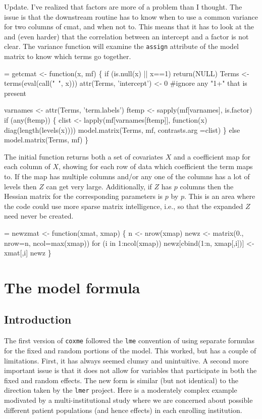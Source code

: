 \documentclass{article}
\begin{document}
Update. I've realized that factors are more of a problem than I   %
thought.  The issue is that the downstream routine has to know
when to use a common variance for two columns of cmat, and when not to.
This means that it has to look at the 
and (even harder) that the correlation between an intercept and a factor
is not clear.  The variance function will examine the \Verb!assign! attribute
of the model matrix to know which terms go together.
\begin{nwchunk}
=
 getcmat <- function(x, mf) \{
     if (is.null(x) || x==1) return(NULL)
     Terms <- terms(eval(call("~", x)))
     attr(Terms, 'intercept') <- 0  #ignore any "1+" that is present
 
     varnames <-  attr(Terms, 'term.labels')
     ftemp <- sapply(mf[varnames], is.factor)
     if (any(ftemp)) \{
         clist <- lapply(mf[varnames[ftemp]], 
                         function(x) diag(length(levels(x))))
         model.matrix(Terms, mf, contrasts.arg =clist)
         \}
     else model.matrix(Terms, mf)
     \}
\end{nwchunk}

The initial function returns both a set of covariates $X$ and
a coefficient map for each column of $X$, showing for each
row of data which coefficient the term maps to.
If the map has multiple columns and/or any one of the columns has a lot of 
levels then $Z$ can get very large.  
Additionally, if $Z$ has $p$ columns then the Hessian matrix 
for the corresponding
parameters is $p$ by $p$.  
This is an area where the code could use more sparse matrix intelligence, i.e.,
so that the expanded $Z$ need never be created.

\begin{nwchunk}
=
 newzmat <- function(xmat, xmap) \{
     n <- nrow(xmap)
     newz <- matrix(0., nrow=n, ncol=max(xmap))
     for (i in 1:ncol(xmap)) 
         newz[cbind(1:n, xmap[,i])] <- xmat[,i]
     newz
     \}
\end{nwchunk}
\section{The model formula}
\label{sect:formula}
\subsection{Introduction}
The first version of \Verb!coxme! followed the \Verb?lme? convention of
using separate formulas for the fixed and random portions of the
model.
This worked, but has a couple of limitations.
First, it has always seemed clumsy and unintuitive.  
A second more important issue is that it does not allow for
variables that participate in both the fixed and random effects. 
The new form is similar (but not identical) to the direction
taken by the \Verb!lmer! project.  
Here is a moderately complex example modivated by a multi-institutional
study where we are concerned about possible different patient
populations (and hence effects) in each enrolling institution.
\end{document}
